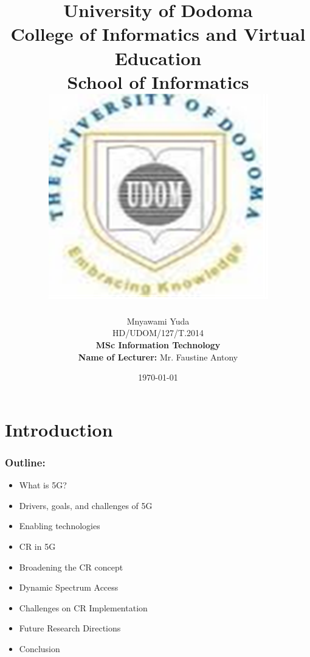 \documentclass{beamer}
\begin{document}
\title{University of Dodoma\\ 
College of Informatics and Virtual Education\\
School of Informatics\\
\includegraphics[scale=0.5]{udomlogo}
}
\author{Mnyawami Yuda\\
HD/UDOM/127/T.2014\\
\textbf{MSc Information Technology}\\
\textbf{Name of Lecturer:} Mr. Faustine Antony
} 
\date{\today} 

\begin{frame}
\titlepage
\end{frame}
\section{Introduction}
\begin{frame}
\frametitle{Outline:}
\begin{itemize}
\item What is 5G?\\
\item Drivers, goals, and challenges of 5G\\
\item Enabling technologies\\
\item CR in 5G\\
\item Broadening the CR concept\\
\item Dynamic Spectrum Access\\
\item Challenges on CR Implementation\\
\item Future Research Directions\\
\item Conclusion\\
\end{itemize}
 

\end{frame}
\end{document}
